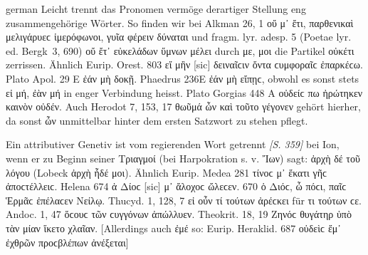 \begin{otherlanguage*}{german}
Leicht trennt das Pronomen vermöge derartiger Stellung eng zusammengehörige Wörter. So finden wir bei Alkman 26, 1 οὔ μ᾽ ἔτι, παρθενικαὶ μελιγάρυεϲ ἱμερόφωνοι, γυῖα φέρειν δύναται und fragm. lyr. adesp. 5 (Poetae lyr. ed. Bergk~3, 690) οὔ  ἔτ᾽ εὐκελάδων ὕμνων μέλει durch με, μοι die Partikel οὐκέτι zerrissen. Ähnlich Eurip. Orest. 803 εἴ  μἢν [sic] δειναῖϲιν ὄντα ϲυμφοραῖϲ ἐπαρκέϲω. Plato Apol. 29 Ε ἐάν  μὴ δοκῇ. Phaedrus 236Ε ἐάν  μὴ εἴπῃϲ, obwohl es sonst stets εἰ μή, ἐὰν μή in enger Verbindung heisst. Plato Gorgias 448 A οὐδείϲ  πω ἠρώτηκεν καινὸν οὐδέν. Auch Herodot 7, 153, 17 θωῦμά  ὦν καὶ τοῦτο γέγονεν gehört hierher, da sonst ὦν unmittelbar hinter dem ersten Satzwort zu stehen pflegt.

Ein attributiver Genetiv ist vom regierenden Wort getrennt \hypertarget{p359}{\emph{[S. 359]}}\label{p359} bei Ion, wenn er zu Beginn seiner Τριαγμοί (bei Harpokration s. v. Ἴων) sagt: ἀρχὴ δέ  τοῦ λόγου (Lobeck ἀρχὴ ἧδέ μοι). Ähnlich Eurip. Medea 281 τίνοϲ μ᾽ ἕκατι γῆϲ ἀποϲτέλλειϲ. Helena 674 ἁ Δίοϲ [sic] μ᾽ ἄλοχοϲ ὤλεϲεν. 670 ὁ Διόϲ, ὦ πόϲι,  παῖϲ Ἑρμᾶϲ ἐπέλαϲεν Νείλῳ. Thucyd. 1, 128, 7 εἰ οὖν τί  τούτων ἀρέϲκει für τι τούτων ϲε. Andoc. 1, 47 ὅϲουϲ  τῶν ϲυγγόνων ἀπώλλυεν. Theokrit. 18, 19 Ζηνόϲ  θυγάτηρ ὑπὸ τὰν μίαν ἵκετο χλαῖαν. [Allerdings auch ἐμέ so: Eurip. Heraklid. 687 οὐδεὶϲ ἔμ᾽ ἐχθρῶν προϲβλέπων ἀνέξεται]


\end{otherlanguage*}
